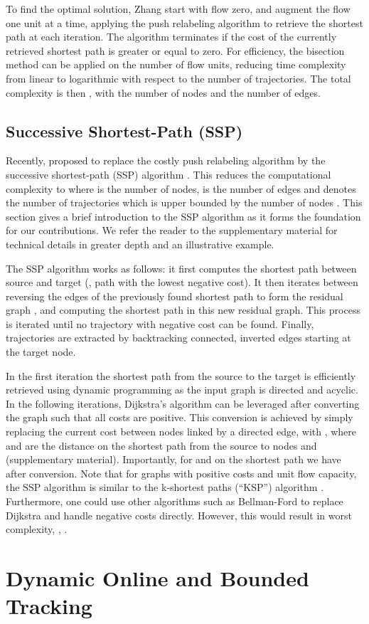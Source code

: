 \documentclass[10pt,twocolumn,letterpaper]{article}
\begin{document}
To find the optimal solution, Zhang \etal \cite{Zhang2008CVPR} start with flow zero, and augment the flow one unit at a time, applying the push relabeling algorithm \cite{Goldberg1997JA} to retrieve the shortest path at each iteration. The algorithm terminates if the cost of the currently retrieved shortest path is greater or equal to zero.
For efficiency, the bisection method can be applied on the number of flow units, reducing time complexity from linear to logarithmic with respect to the number of trajectories. The total complexity is then  , with  the number of nodes and  the number of edges. 

\subsection{Successive Shortest-Path (SSP)} \label{subsec:SSP}

Recently, \cite{Berclaz2011PAMI,Pirsiavash2011CVPR}  proposed to replace the costly push relabeling algorithm by the successive shortest-path (SSP) algorithm \cite[p.~104]{Ahuja1993}. This reduces the computational complexity to  where  is the number of nodes,  is the number of edges and  denotes the number of trajectories which is upper bounded by the number of nodes . This section gives a brief introduction to the SSP algorithm as it forms the foundation for our contributions.  We refer the reader to the supplementary material for technical details in greater depth and an illustrative example.

The SSP algorithm  works as follows: it first computes the shortest path between source and target (\ie, path with  the lowest negative cost). 
It then iterates between reversing the edges of the previously found shortest path to form the residual graph ,  and computing the shortest path in this new residual graph.   This process is iterated until no trajectory with negative cost can be found.  
 Finally, trajectories are extracted by backtracking connected, inverted edges starting at the target node. 

In the first iteration the shortest path from the source to the target is efficiently retrieved using dynamic programming \cite[p.~655]{Cormen2001} as the input graph is directed and acyclic. In the following iterations, Dijkstra's algorithm can be leveraged after converting the graph such that all costs are positive.
This conversion is achieved by simply replacing the current cost  between nodes  linked by a directed edge, with , where  and  are the distance on the shortest path from the source to nodes  and  (\cf supplementary material). Importantly, for  and  on the shortest path we have  after conversion.
Note that for graphs with positive costs and unit flow capacity, the SSP algorithm is similar to the k-shortest paths (``KSP'') algorithm \cite{Suurballe1974Networks,Suurballe1984Networks}. 
Furthermore, one could use other algorithms such as  Bellman-Ford to replace Dijkstra and handle  negative costs directly. However,  this  would result in worst complexity, \ie,  .  \section{Dynamic Online and Bounded Tracking}
\label{sec:dynamicOnlineBounded}
\end{document}
